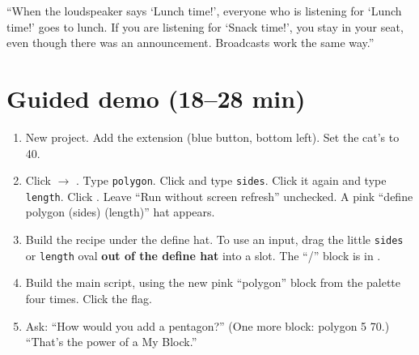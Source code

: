 \begin{analogy}
\enquote{When the loudspeaker says \enquote{Lunch time!}, everyone who is listening for \enquote{Lunch time!} goes to lunch. If you are listening for \enquote{Snack time!}, you stay in your seat, even though there was an announcement. Broadcasts work the same way.}
\end{analogy}

\section{Guided demo (18--28 min)}
\begin{workedexample}
\begin{enumerate}[leftmargin=1.4em,itemsep=1pt]
  \item New project. Add the  extension (blue button, bottom left). Set the cat's  to 40.
  \item Click  $\rightarrow$ . Type \texttt{polygon}. Click  and type \texttt{sides}. Click it again and type \texttt{length}. Click . Leave \enquote{Run without screen refresh} unchecked. A pink \enquote{define polygon (sides) (length)} hat appears.
  \item Build the recipe under the define hat. To use an input, drag the little \texttt{sides} or \texttt{length} oval \textbf{out of the define hat} into a slot. The \enquote{/} block is in .
  \item Build the main script, using the new pink \enquote{polygon} block from the palette four times. Click the flag.
  \item Ask: \enquote{How would you add a pentagon?} (One more block: polygon 5 70.) \enquote{That's the power of a My Block.}
\end{enumerate}
\begin{center}
\begin{scratch}[scale=0.78]
\end{scratch}
\hspace{0.8cm}
\begin{scratch}[scale=0.78]
\end{scratch}
\end{center}
\end{workedexample}

